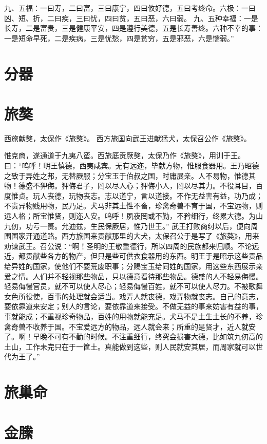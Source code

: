 \documentclass[a4paper,12pt,UTF8,twoside]{ctexbook}
\begin{document}
九、五福：一曰寿，二曰富，三曰康宁，四曰攸好德，五曰考终命。六极：一曰凶、短、折，二曰疾，三曰忧，四曰贫，五曰恶，六曰弱。
九、五种幸福：一是长寿，二是富贵，三是健康平安，四是遵行美德，五是长寿善终。六种不幸的事：一是短命早死，二是疾病，三是忧愁，四是贫穷，五是邪恶，六是懦弱。”

\chapter{分器}

\chapter{旅獒}

西旅献獒，太保作《旅獒》。
西方旅国向武王进献猛犬，太保召公作《旅獒》。

惟克商，遂通道于九夷八蛮。西旅厎贡厥獒，太保乃作《旅獒》，用训于王。曰：“呜呼！明王慎德，西夷咸宾。无有远迩，毕献方物，惟服食器用。王乃昭德之致于异姓之邦，无替厥服；分宝玉于伯叔之国，时庸展亲。人不易物，惟德其物！德盛不狎侮。狎侮君子，罔以尽人心；狎侮小人，罔以尽其力。不役耳目，百度惟贞。玩人丧德，玩物丧志。志以道宁，言以道接。不作无益害有益，功乃成；不贵异物贱用物，民乃足。犬马非其土性不畜，珍禽奇兽不育于国，不宝远物，则远人格；所宝惟贤，则迩人安。呜呼！夙夜罔或不勤，不矜细行，终累大德。为山九仞，功亏一篑。允迪兹，生民保厥居，惟乃世王。”
武王打败商纣以后，便向周围国家开通道路。西方旅国来贡献那里的大犬，太保召公于是写了《旅獒》，用来劝谏武王。召公说：“啊！圣明的王敬重德行，所以四周的民族都来归顺。不论远近，都贡献些各方的物产，但只是些可供衣食器用的东西。明王于是昭示这些贡品给异姓的国家，使他们不要荒废职事；分赐宝玉给同姓的国家，用这些东西展示亲爱之情。人们并不轻视那些物品，只以德意看待那些物品。德盛的人不轻易侮慢。轻易侮慢官员，就不可以使人尽心；轻易侮慢百姓，就不可以使人尽力。不被歌舞女色所役使，百事的处理就会适当。戏弄人就丧德，戏弄物就丧志。自己的意志，要依靠道来安定；别人的言论，要依靠道来接受。不做无益的事来妨害有益的事，事就能成；不重视珍奇物品，百姓的用物就能充足。犬马不是土生土长的不养，珍禽奇兽不收养于国。不宝爱远方的物品，远人就会来；所重的是贤才，近人就安了。啊！早晚不可有不勤的时候。不注重细行，终究会损害大德，比如筑九仞高的土山，工作未完只在于一筐土。真能做到这些，则人民就安其居，而周家就可以世代为王了。”

\chapter{旅巢命}

\chapter{金縢}
\end{document}
